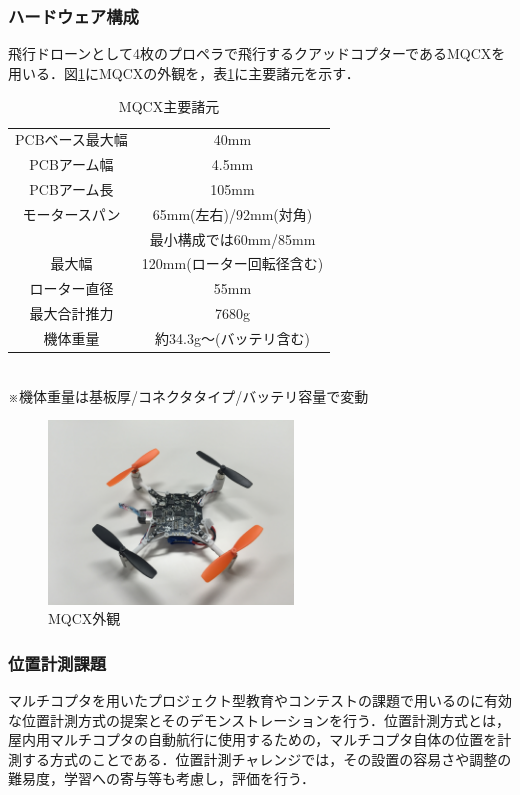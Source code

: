 \documentclass[submit]{ipsj}
\begin{document}
\subsubsection{ハードウェア構成}
飛行ドローンとして4枚のプロペラで飛行するクアッドコプターであるMQCX\cite{mqcx}を用いる．図\ref{fig:mqcx}にMQCXの外観を，表\ref{table:mqcx}に主要諸元を示す．

\begin{table}[htb]
\caption{MQCX主要諸元} \label{table:mqcx}
\centering
\begin{tabular}{c|c}\hline
PCBベース最大幅 & 40mm \\
PCBアーム幅 & 4.5mm\\
PCBアーム長 & 105mm\\
モータースパン & 65mm(左右)/92mm(対角)\\
& 最小構成では60mm/85mm\\
最大幅 & 120mm(ローター回転径含む)\\
ローター直径 & 55mm\\
最大合計推力 & 7680g\\
機体重量 & 約34.3g〜(バッテリ含む)\\ \hline
\end{tabular}\\
※機体重量は基板厚/コネクタタイプ/バッテリ容量で変動
\end{table}

\begin{figure}[tb]
\centering
\includegraphics[width=6.5cm]{images/mqcx.jpg}
\caption{MQCX外観} \label{fig:mqcx}
\end{figure}

\subsubsection{位置計測課題}
マルチコプタを用いたプロジェクト型教育やコンテストの課題で用いるのに有効な位置計測方式の提案とそのデモンストレーションを行う．位置計測方式とは，屋内用マルチコプタの自動航行に使用するための，マルチコプタ自体の位置を計測する方式のことである．位置計測チャレンジでは，その設置の容易さや調整の難易度，学習への寄与等も考慮し，評価を行う．
\end{document}
